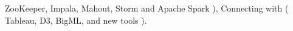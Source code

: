 \documentclass[11pt,a4paper]{moderncv}
\begin{document}
{                ZooKeeper,                                                                                        %
                Impala,                                                                                           %
                Mahout,                                                                                           %
                Storm and                                                                                         %
                Apache Spark                                                                                      %
                ),                                                                                                %
            Connecting with (                                                                                     %
                Tableau,                                                                                          %
                D3,                                                                                               %
                BigML,                                                                                            %
                and new tools                                                                                     %
                ).                                                                                                %
    }
\end{document}
